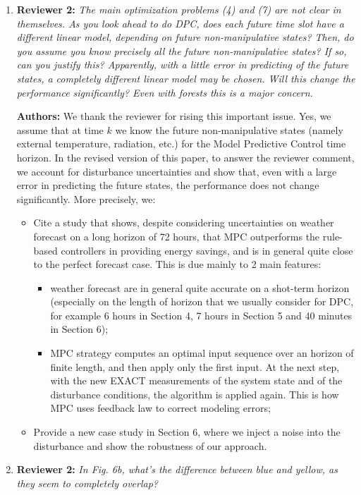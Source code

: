 \documentclass{article}
\begin{document}
\begin{enumerate}
\item \textbf{Reviewer 2:} \textit{The main optimization problems (4) and (7) are not clear in themselves. As you look ahead to do DPC, does each future time slot have a different linear model, depending on future non-manipulative states? Then, do you assume you know precisely all the future non-manipulative states? If so, can you justify this? Apparently, with a little error in predicting of the future states, a completely different linear model may be chosen. Will this change the performance significantly? Even with forests this is a major concern.}

\textbf{Authors:} We thank the reviewer for rising this important issue. Yes, we assume that at time $k$ we know the future non-manipulative states (namely external temperature, radiation, etc.) for the Model Predictive Control time horizon. In the revised version of this paper, to answer the reviewer comment, we account for disturbance uncertainties and show that, even with a large error in predicting the future states, the performance does not change significantly. More precisely, we:
	\begin{itemize}
		\item Cite a study that shows, despite considering uncertainties on weather forecast on a long horizon of 72 hours, that MPC outperforms the rule-based controllers in providing energy savings, and is in general quite close to the perfect forecast case. This is due mainly to 2 main features:
		\begin{itemize}
			\item weather forecast are in general quite accurate on a shot-term horizon (especially on the length of horizon that we usually consider for DPC, for example 6 hours in Section 4, 7 hours in Section 5 and 40 minutes in Section 6);
			\item MPC strategy computes an optimal input sequence over an horizon of finite length, and then apply only the first input. At the next step, with the new EXACT measurements of the system state and of the disturbance conditions, the algorithm is applied again. This is how MPC uses feedback law to correct modeling errors;
	\end{itemize}
		\item Provide a new case study in Section 6, where we inject a noise into the disturbance and show the robustness of our approach.
	\end{itemize}

\item \textbf{Reviewer 2:} \textit{In Fig. 6b, what's the difference between blue and yellow, as they seem to completely overlap?}


\end{enumerate}
\end{document}
